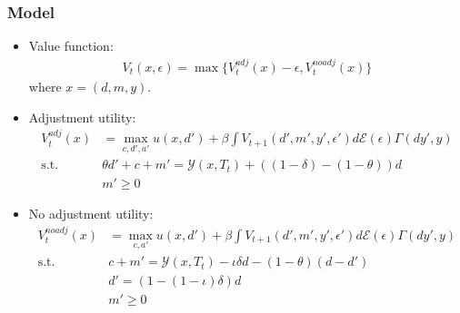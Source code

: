 \documentclass[english,xcolor=svgnames]{beamer}
\begin{document}

\begin{frame}
    \frametitle{Model}
	\begin{itemize}
		\item Value function:
		\begin{align*}
            V_t(x,\epsilon) = \max\{V_t^{adj}(x) - \epsilon,V_t^{noadj}(x)\}
        \end{align*}
        where $x=(d,m,y)$.
        \item Adjustment utility:
        \begin{align*}
            V_t^{adj}(x) &= \max_{c,d',a'} u(x,d') + \beta \int V_{t+1}(d',m',y',\epsilon')d\mathcal{E}(\epsilon) \Gamma(dy',y) \\
            \text{s.t.} \; &\theta d' + c + m' = \mathcal{Y}(x,T_t) + ((1-\delta) - (1-\theta))d \\
            &m'\ge 0
        \end{align*}
        \item No adjustment utility:
        \begin{align*}
            V_t^{noadj}(x) &= \max_{c,a'} u(x,d') + \beta \int V_{t+1}(d',m',y',\epsilon')d\mathcal{E}(\epsilon) \Gamma(dy',y) \\
            \text{s.t.} \; &  c + m' = \mathcal{Y}(x,T_t) -\iota \delta d - (1-\theta)(d-d') \\
            &d' = (1 - (1-\iota)\delta) d \\
            &m'\ge 0 
        \end{align*}
	\end{itemize}
\end{frame}
\end{document}
